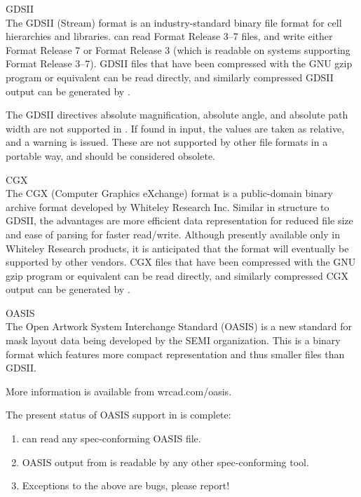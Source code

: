 \begin{description}
\item{GDSII}\\
The GDSII (Stream) format is an industry-standard binary file format
for cell hierarchies and libraries.  {\Xic} can read Format Release
3--7 files, and write either Format Release 7 or Format Release 3
(which is readable on systems supporting Format Release 3--7).  GDSII
files that have been compressed with the GNU {\vt gzip} program or
equivalent can be read directly, and similarly compressed GDSII output
can be generated by {\Xic}.

The GDSII directives absolute magnification, absolute angle, and
absolute path width are not supported in {\Xic}.  If found in input,
the values are taken as relative, and a warning is issued.  These are
not supported by other file formats in a portable way, and should be
considered obsolete.

\item{CGX}\\
The CGX (Computer Graphics eXchange) format is a public-domain binary
archive format developed by Whiteley Research Inc.  Similar in
structure to GDSII, the advantages are more efficient data
representation for reduced file size and ease of parsing for faster
read/write.  Although presently available only in Whiteley Research
products, it is anticipated that the format will eventually be
supported by other vendors.  CGX files that have been compressed with
the GNU {\vt gzip} program or equivalent can be read directly, and
similarly compressed CGX output can be generated by {\Xic}.

\item{OASIS}\\
The Open Artwork System Interchange Standard (OASIS) is a new standard
for mask layout data being developed by the SEMI organization.  This
is a binary format which features more compact representation and thus
smaller files than GDSII.

More information is available from {\vt wrcad.com/oasis}.

The present status of OASIS support in {\Xic} is complete:
\begin{enumerate}
\item{{\Xic} can read any spec-conforming OASIS file.}
\item{OASIS output from {\Xic} is readable by any other
spec-conforming tool.}
\item{Exceptions to the above are {\cb bugs}, please report!}
\end{enumerate}


\end{description}
